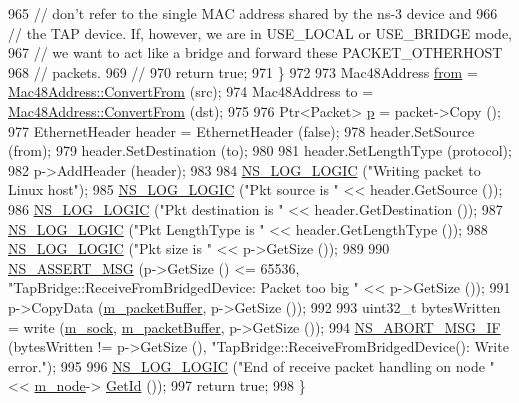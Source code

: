 \begin{DoxyCode}
965       \textcolor{comment}{// don't refer to the single MAC address shared by the ns-3 device and }
966       \textcolor{comment}{// the TAP device.  If, however, we are in USE\_LOCAL or USE\_BRIDGE mode, }
967       \textcolor{comment}{// we want to act like a bridge and forward these PACKET\_OTHERHOST }
968       \textcolor{comment}{// packets.}
969       \textcolor{comment}{//}
970       \textcolor{keywordflow}{return} \textcolor{keyword}{true};
971     \}
972 
973   Mac48Address \hyperlink{lte__amc_8m_a1b4c81ff74eb1a626b5ade44c81004b3}{from} = \hyperlink{classns3_1_1Mac48Address_a911ce13603a9ef837545a032b6523ae4}{Mac48Address::ConvertFrom} (src);
974   Mac48Address to = \hyperlink{classns3_1_1Mac48Address_a911ce13603a9ef837545a032b6523ae4}{Mac48Address::ConvertFrom} (dst);
975 
976   Ptr<Packet> \hyperlink{lte__link__budget_8m_ac9de518908a968428863f829398a4e62}{p} = packet->Copy ();
977   EthernetHeader header = EthernetHeader (\textcolor{keyword}{false});
978   header.SetSource (from);
979   header.SetDestination (to);
980 
981   header.SetLengthType (protocol);
982   p->AddHeader (header);
983 
984   \hyperlink{group__logging_ga88acd260151caf2db9c0fc84997f45ce}{NS\_LOG\_LOGIC} (\textcolor{stringliteral}{"Writing packet to Linux host"});
985   \hyperlink{group__logging_ga88acd260151caf2db9c0fc84997f45ce}{NS\_LOG\_LOGIC} (\textcolor{stringliteral}{"Pkt source is "} << header.GetSource ());
986   \hyperlink{group__logging_ga88acd260151caf2db9c0fc84997f45ce}{NS\_LOG\_LOGIC} (\textcolor{stringliteral}{"Pkt destination is "} << header.GetDestination ());
987   \hyperlink{group__logging_ga88acd260151caf2db9c0fc84997f45ce}{NS\_LOG\_LOGIC} (\textcolor{stringliteral}{"Pkt LengthType is "} << header.GetLengthType ());
988   \hyperlink{group__logging_ga88acd260151caf2db9c0fc84997f45ce}{NS\_LOG\_LOGIC} (\textcolor{stringliteral}{"Pkt size is "} << p->GetSize ());
989 
990   \hyperlink{assert_8h_aff5ece9066c74e681e74999856f08539}{NS\_ASSERT\_MSG} (p->GetSize () <= 65536, \textcolor{stringliteral}{"TapBridge::ReceiveFromBridgedDevice: Packet too big 
      "} << p->GetSize ());
991   p->CopyData (\hyperlink{classns3_1_1TapBridge_a32b939096e18f39f76a86401d182cda5}{m\_packetBuffer}, p->GetSize ());
992 
993   uint32\_t bytesWritten = write (\hyperlink{classns3_1_1TapBridge_a52d87d41aa840377feebe63b5c5f2f3c}{m\_sock}, \hyperlink{classns3_1_1TapBridge_a32b939096e18f39f76a86401d182cda5}{m\_packetBuffer}, p->GetSize ());
994   \hyperlink{group__fatal_ga6653324225bc139e46deea177614ceee}{NS\_ABORT\_MSG\_IF} (bytesWritten != p->GetSize (), \textcolor{stringliteral}{"TapBridge::ReceiveFromBridgedDevice():
       Write error."});
995 
996   \hyperlink{group__logging_ga88acd260151caf2db9c0fc84997f45ce}{NS\_LOG\_LOGIC} (\textcolor{stringliteral}{"End of receive packet handling on node "} << \hyperlink{classns3_1_1TapBridge_aab85ad5d27b8de91e7a02e8d8ee4332e}{m\_node}->
      \hyperlink{classns3_1_1Node_aaf49b64a843565ce3812326313b370ac}{GetId} ());
997   \textcolor{keywordflow}{return} \textcolor{keyword}{true};
998 \}
\end{DoxyCode}


